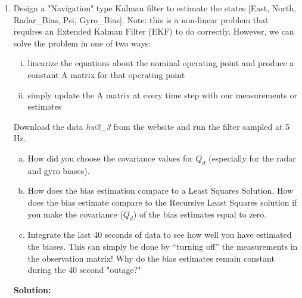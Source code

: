 \documentclass[11pt]{article}
\newcommand{\solution}{\textbf{Solution: \\}}
\begin{document}
\begin{enumerate}[label=\textbf{\arabic*.}]
  \item Design a "Navigation" type Kalman filter to estimate the states [East, 
  North, Radar\_Bias, Psi, Gyro\_Bias]. Note: this is a non-linear problem that 
  requires an Extended Kalman Filter (EKF) to do correctly. However, we can solve 
  the problem in one of two ways: 
  \begin{enumerate}[(i)]
    \itemsep -2pt
    \item linearize the equations about the nominal operating point and produce 
    a constant A matrix for that operating point
    \item simply update the A matrix at every time step with our measurements or 
    estimates
  \end{enumerate}
  Download the data \emph{hw3\_3} from the website and run the filter sampled at 
  5 Hz.
  \begin{enumerate}[(a)]
    \itemsep -2pt
    \item How did you choose the covariance values for $Q_d$ (especially for the 
    radar and gyro biases).
    \item How does the bias estimation compare to a Least Squares Solution. How 
    does the bias estimate compare to the Recursive Least Squares solution if 
    you make the covariance ($Q_d$) of the bias estimates equal to zero.
    \item Integrate the last 40 seconds of data to see how well you have 
    estimated the biases. This can simply be done by “turning off” the 
    measurements in the observation matrix! Why do the bias estimates remain 
    constant during the 40 second "outage?"
  \end{enumerate}
  \solution


\end{enumerate}
\end{document}
